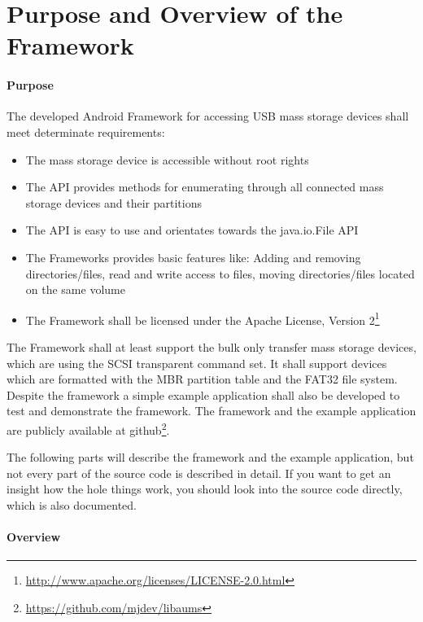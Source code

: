 \chapter{Purpose and Overview of the Framework}

\subsubsection{Purpose}

The developed Android Framework for accessing USB mass storage devices shall meet determinate requirements:

\begin{itemize}
\item The mass storage device is accessible without root rights
\item The API provides methods for enumerating through all connected mass storage devices and their partitions
\item The API is easy to use and orientates towards the java.io.File API
\item The Frameworks provides basic features like: Adding and removing directories/files, read and write access to files, moving directories/files located on the same volume
\item The Framework shall be licensed under the Apache License, Version 2\footnote{\url{http://www.apache.org/licenses/LICENSE-2.0.html}}
\end{itemize}

The Framework shall at least support the bulk only transfer mass storage devices, which are using the SCSI transparent command set. It shall support devices which are formatted with the MBR partition table and the FAT32 file system. Despite the framework a simple example application shall also be developed to test and demonstrate the framework. The framework and the example application are publicly available at github\footnote{\url{https://github.com/mjdev/libaums}}.

The following parts will describe the framework and the example application, but not every part of the source code is described in detail. If you want to get an insight how the hole things work, you should look into the source code directly, which is also documented.

\subsubsection{Overview}
\label{implementation_overview}

